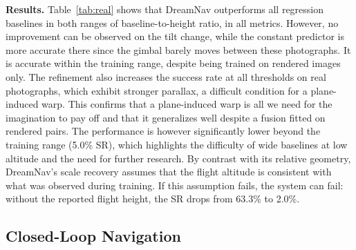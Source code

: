 \noindent \textbf{Results.} Table~\ref{tab:real} shows that DreamNav outperforms all regression baselines in both ranges of baseline-to-height ratio, in all metrics. However, no improvement can be observed on the tilt change, while the constant predictor is more accurate there since the gimbal barely moves between these photographs. It is accurate within the training range, despite being trained on rendered images only. The refinement also increases the success rate at all thresholds on real photographs, which exhibit stronger parallax, a difficult condition for a plane-induced warp. This confirms that a plane-induced warp is all we need for the imagination to pay off and that it generalizes well despite a fusion fitted on rendered pairs. The performance is however significantly lower beyond the training range (5.0\% SR), which highlights the difficulty of wide baselines at low altitude and the need for further research. By contrast with its relative geometry, DreamNav's scale recovery assumes that the flight altitude is consistent with what was observed during training. If this assumption fails, the system can fail: without the reported flight height, the SR drops from 63.3\% to 2.0\%.

\subsection{Closed-Loop Navigation}
\label{sec:closedloop}

